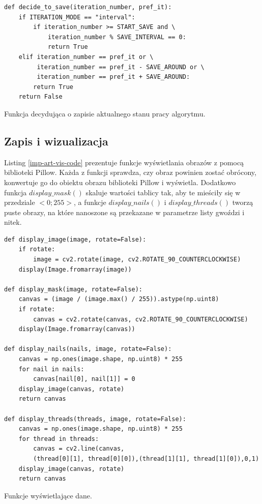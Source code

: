         \begin{code}[H]
        \begin{verbatim}
def decide_to_save(iteration_number, pref_it):
    if ITERATION_MODE == "interval":
        if iteration_number >= START_SAVE and \
            iteration_number % SAVE_INTERVAL == 0:
            return True
    elif iteration_number == pref_it or \
         iteration_number == pref_it - SAVE_AROUND or \
         iteration_number == pref_it + SAVE_AROUND:
        return True
    return False
        \end{verbatim}
        \caption{Funkcja decydująca o zapisie aktualnego stanu pracy algorytmu.}
        \label{imp-art-decide-save-code}
        \end{code}
        
        \subsection{Zapis i wizualizacja} \label{imp-art-wiz}
        Listing \ref{imp-art-vis-code} prezentuje funkcje wyświetlania obrazów z pomocą biblioteki Pillow. Każda z funkcji sprawdza, czy obraz powinien zostać obrócony, konwertuje go do obiektu obrazu biblioteki Pillow i wyświetla. Dodatkowo funkcja \(display\_mask()\) skaluje wartości tablicy tak, aby te mieściły się w przedziale \(<0;255>\), a funkcje \(display\_nails()\) i \(display\_threads()\) tworzą puste obrazy, na które nanoszone są przekazane w parametrze listy gwoździ i nitek. 
        \begin{code}[H]
        \begin{verbatim}
def display_image(image, rotate=False):
    if rotate:
        image = cv2.rotate(image, cv2.ROTATE_90_COUNTERCLOCKWISE)
    display(Image.fromarray(image))

def display_mask(image, rotate=False):
    canvas = (image / (image.max() / 255)).astype(np.uint8)
    if rotate:
        canvas = cv2.rotate(canvas, cv2.ROTATE_90_COUNTERCLOCKWISE)
    display(Image.fromarray(canvas))

def display_nails(nails, image, rotate=False):
    canvas = np.ones(image.shape, np.uint8) * 255
    for nail in nails:
        canvas[nail[0], nail[1]] = 0
    display_image(canvas, rotate)
    return canvas

def display_threads(threads, image, rotate=False):
    canvas = np.ones(image.shape, np.uint8) * 255
    for thread in threads:
        canvas = cv2.line(canvas, 
        (thread[0][1], thread[0][0]),(thread[1][1], thread[1][0]),0,1)
    display_image(canvas, rotate)
    return canvas
        \end{verbatim}
        \caption{Funkcje wyświetlające dane.}
        \label{imp-art-vis-code}
        \end{code}
        
